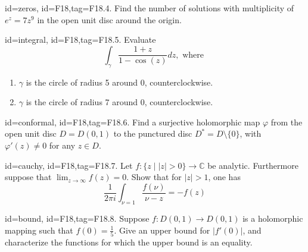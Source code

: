 \documentclass[12pt,letterpaper]{article}
\theoremstyle{plain}
\theoremstyle{definition}
\begin{document}
{\item[id=zeros, id=F18,tag=F18.4.]
Find the number of solutions with multiplicity of $e^z = 7z^9$ in the open unit disc around the origin.

\item[id=integral, id=F18,tag=F18.5.]
Evaluate
\[
	\int_{\gamma} \frac{1+z}{1 - \cos(z)} dz, \text{ where }
\]
\begin{enumerate}[label=(\alph*)]\onlyitems
\item $\gamma$ is the circle of radius 5 around 0, counterclockwise.
\item $\gamma$ is the circle of radius 7 around 0, counterclockwise.
\end{enumerate}

\item[id=conformal, id=F18,tag=F18.6.]
Find a surjective holomorphic map $\varphi$ from the open unit disc $D = D(0,1)$ to the punctured disc $D^* = D \setminus \{0\}$, with $\varphi'(z) \ne 0$ for any $z \in D$. 
\item[id=cauchy, id=F18,tag=F18.7.]
Let $f : \{z \mid | z | > 0\} \rightarrow \mathbb{C}$ be analytic. Furthermore suppose that $\lim_{z\rightarrow \infty} f(z) = 0$. Show that for $| z | > 1$, one has
\[
	\frac{1}{2\pi i} \int_{\nu = 1} \frac{f(\nu)}{\nu - z} = - f(z)
\]
\item[id=bound, id=F18,tag=F18.8.]
Suppose $f : D(0,1) \rightarrow D(0,1)$ is a holomorphic mapping such that $f(0) = \frac{1}{5}$. Give an upper bound for $| f'(0) |$, and characterize the functions for which the upper bound is an equality.



}
\end{document}
